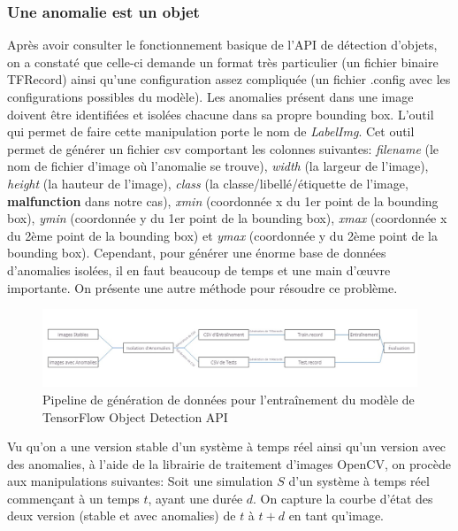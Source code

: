 \documentclass[french]{article}
\theoremstyle{mytheoremstyle}
\theoremstyle{mytheoremstyle}
\theoremstyle{myproblemstyle}
\begin{document}
        \subsubsection{Une anomalie est un objet}
        Après avoir consulter le fonctionnement basique de l'API de détection d'objets, on a constaté que celle-ci demande un format très particulier (un fichier binaire TFRecord) ainsi qu'une configuration assez compliquée (un fichier .config avec les configurations possibles du modèle). Les anomalies présent dans une image doivent être identifiées et isolées chacune dans sa propre bounding box. L'outil qui permet de faire cette manipulation porte le nom de \textit{LabelImg}. Cet outil permet de générer un fichier csv comportant les colonnes suivantes: \textit{filename} (le nom de fichier d'image où l'anomalie se trouve), \textit{width} (la largeur de l'image), \textit{height} (la hauteur de l'image), \textit{class} (la classe/libellé/étiquette de l'image, \textbf{malfunction} dans notre cas), \textit{xmin} (coordonnée x du 1er point de la bounding box), \textit{ymin} (coordonnée y du 1er point de la bounding box), \textit{xmax} (coordonnée x du 2ème point de la bounding box) et \textit{ymax} (coordonnée y du 2ème point de la bounding box). Cependant, pour générer une énorme base de données d'anomalies isolées, il en faut beaucoup de temps et une main d'œuvre importante. On présente une autre méthode pour résoudre ce problème.
        \begin{figure}[H]
            \centering
            \includegraphics[width=\textwidth]{images/od_datagen.jpg}
            \caption{Pipeline de génération de données pour l'entraînement du modèle de TensorFlow Object Detection API}
            \label{}
        \end{figure}
        \indent Vu qu'on a une version stable d'un système à temps réel ainsi qu'un version avec des anomalies, à l'aide de la librairie de traitement d'images OpenCV, on procède aux manipulations suivantes:
        \newline
        Soit une simulation $S$ d'un système à temps réel commençant à un temps $t$, ayant une durée $d$. On capture la courbe d'état des deux version (stable et avec anomalies) de $t$ à $t+d$ en tant qu'image.
\end{document}
